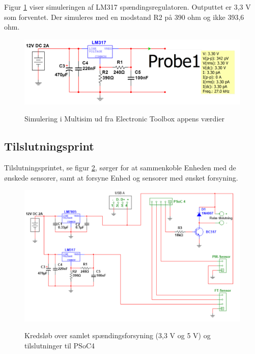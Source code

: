 Figur \ref{lab:LM317_SIMULERING} viser simuleringen af LM317 spændingsregulatoren. Outputtet er 3,3 V som forventet. Der simuleres med en modstand R2 på 390 ohm og ikke 393,6 ohm.

\begin{figure}[H] \centering
{\includegraphics[width=\textwidth]{filer/design/Billeder/LM317_SIMULATION}}
\caption{Simulering i Multisim ud fra Electronic Toolbox appens værdier}
\label{lab:LM317_SIMULERING}
\raggedright
\end{figure}


\subsection{Tilslutningsprint}

Tilslutningsprintet, se figur \ref{lab:PSU_connections}, sørger for at sammenkoble Enheden med de ønskede sensorer, samt at forsyne Enhed og sensorer med ønsket forsyning.

\begin{figure}[H] \centering
{\includegraphics[width=\textwidth]{filer/design/Billeder/tilslutningsprint}}
\caption{Kredsløb over samlet spændingsforsyning (3,3 V og 5 V) og tilslutninger til PSoC4}
\label{lab:PSU_connections}
\raggedright
\end{figure}


